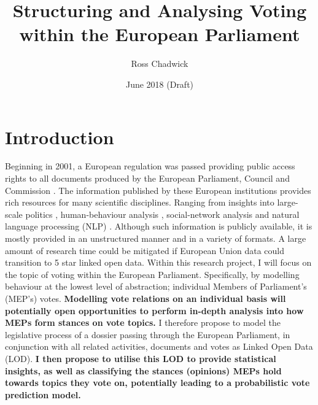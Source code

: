 \documentclass{article}
\title{Structuring and Analysing Voting within the European Parliament}
\author[1]{ Ross Chadwick }
\affil[1]{(Department of Computer Science, Vrije Universiteit Amsterdam)}
\date{June 2018 (Draft)}
\begin{document}
\maketitle

\section{Introduction}
Beginning in 2001, a European regulation was passed providing public access rights to all documents produced by the European Parliament, Council and Commission 
\cite{EURegulation2001}.
The information published by these European institutions provides rich resources for many scientific disciplines. Ranging from insights into large-scale politics 
\cite{Hoyland2014PredictingPA, Greene2015UnveilingTP, Hix2009VotingPA}, human-behaviour analysis \cite{Meserve2007PoliticalAA}, social-network analysis 
\cite{Cherepnalkoski2016RetweetNO, Cherepnalkoski2016CohesionAC, Cherepnalkoski2015ARN, NetworksAttila} and natural language processing (NLP) \cite{Koehn2005EuroparlAP, 
Hajlaoui2014DCEPC}.
\newline
Although such information is publicly available, it is mostly provided in an unstructured manner and in a variety of formats. A large amount of research time could be mitigated if 
European Union data could transition to 5 star linked open data.
\newline
\newline
Within this research project, I will focus on the topic of voting within the European Parliament. Specifically, by modelling behaviour at the lowest level of abstraction; individual 
Members of Parliament's (MEP's) votes. \textbf{Modelling vote relations on an individual basis will potentially open opportunities to perform in-depth analysis into how MEPs form 
stances on vote topics.} I therefore propose to model the legislative process of a dossier passing through the European Parliament, in conjunction with all related activities, 
documents and votes as Linked Open Data (LOD).
\textbf{I then propose to utilise this LOD to provide statistical insights, as well as classifying the stances (opinions) MEPs hold towards topics they vote on, potentially leading 
to a probabilistic vote prediction model.}
\end{document}
